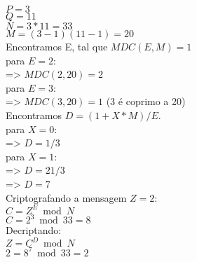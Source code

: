 \documentclass[a4paper,11pt]{article}
\theoremstyle{mytheor}
\begin{document}
$P = 3$\\
$Q = 11$\\
$N = 3 * 11 = 33$\\
$M = (3 - 1)(11 - 1) = 20$\\

Encontramos E, tal que $MDC(E, M) = 1$\\
para $E = 2$:\\
    => $MDC(2, 20) = 2$\\
para $E = 3$:\\
    => $MDC(3, 20) = 1$ (3 é coprimo a 20)\\

Encontramos $D = (1 + X*M) / E$.\\
para $X = 0$:\\
    => $D = 1 / 3$\\
para $X = 1$:\\
    => $D = 21 / 3$\\
    => $D = 7$\\

Criptografando a mensagem $Z = 2$:\\
$C = Z^E \bmod N$\\
$C = 2^3 \bmod 33 = 8$\\

Decriptando:\\
$Z = C^D \bmod N$\\
$2 = 8^7 \bmod 33 = 2$
\end{document}
